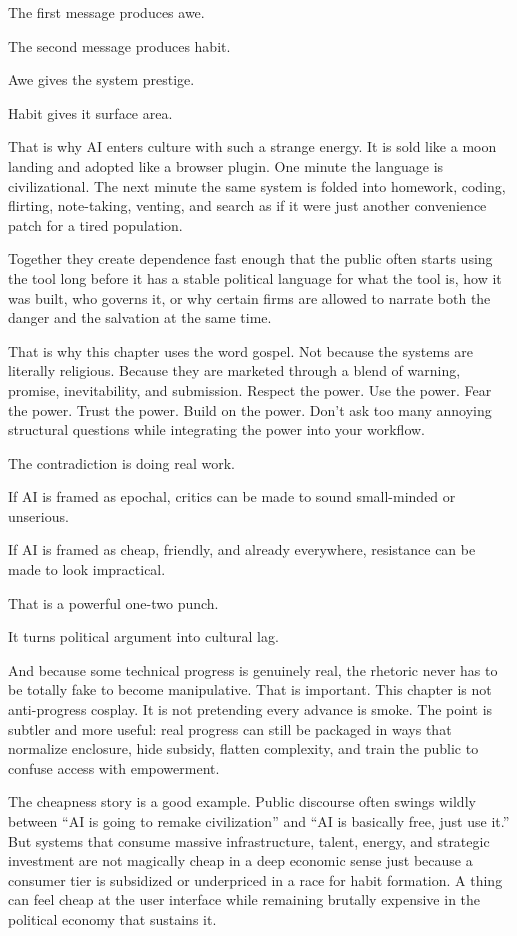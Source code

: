 \documentclass[
  american,
  12pt,
  letterpaper,
]{article}
\begin{document}
The first message produces awe.

The second message produces habit.

Awe gives the system prestige.

Habit gives it surface area.

That is why AI enters culture with such a strange energy. It is sold
like a moon landing and adopted like a browser plugin. One minute the
language is civilizational. The next minute the same system is folded
into homework, coding, flirting, note-taking, venting, and search as if
it were just another convenience patch for a tired population.

Together they create dependence fast enough that the public often starts
using the tool long before it has a stable political language for what
the tool is, how it was built, who governs it, or why certain firms are
allowed to narrate both the danger and the salvation at the same time.

That is why this chapter uses the word gospel. Not because the systems
are literally religious. Because they are marketed through a blend of
warning, promise, inevitability, and submission. Respect the power. Use
the power. Fear the power. Trust the power. Build on the power. Don't
ask too many annoying structural questions while integrating the power
into your workflow.

The contradiction is doing real work.

If AI is framed as epochal, critics can be made to sound small-minded or
unserious.

If AI is framed as cheap, friendly, and already everywhere, resistance
can be made to look impractical.

That is a powerful one-two punch.

It turns political argument into cultural lag.

And because some technical progress is genuinely real, the rhetoric
never has to be totally fake to become manipulative. That is important.
This chapter is not anti-progress cosplay. It is not pretending every
advance is smoke. The point is subtler and more useful: real progress
can still be packaged in ways that normalize enclosure, hide subsidy,
flatten complexity, and train the public to confuse access with
empowerment.

The cheapness story is a good example. Public discourse often swings
wildly between ``AI is going to remake civilization'' and ``AI is
basically free, just use it.'' But systems that consume massive
infrastructure, talent, energy, and strategic investment are not
magically cheap in a deep economic sense just because a consumer tier is
subsidized or underpriced in a race for habit formation. A thing can
feel cheap at the user interface while remaining brutally expensive in
the political economy that sustains it.
\end{document}
